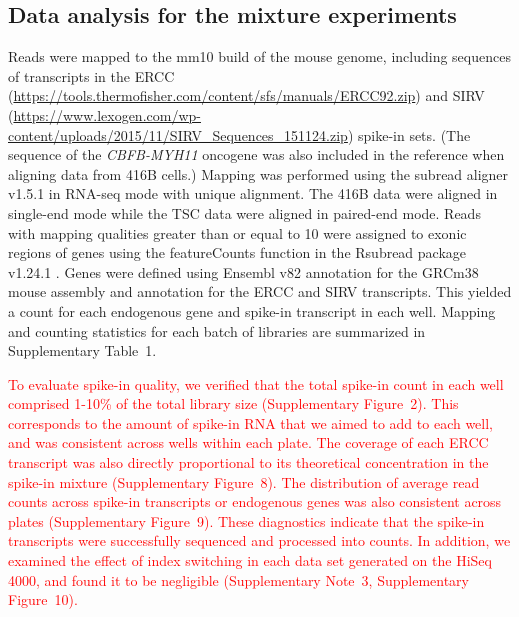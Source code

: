 \documentclass{article}
\newcommand{\suppfigtotals}{2}
\newcommand{\suppfigspikeconc}{8}
\newcommand{\suppfigspikeave}{9}
\newcommand{\suppfigindex}{10}
\newcommand{\suppsecindex}{3}
\newcommand{\supptabstats}{1}
\newcommand{\revised}[1]{\textcolor{red}{#1}}
\begin{document}
\subsection*{Data analysis for the mixture experiments}
Reads were mapped to the mm10 build of the mouse genome, including sequences of transcripts in the ERCC (\url{https://tools.thermofisher.com/content/sfs/manuals/ERCC92.zip}) and SIRV (\url{https://www.lexogen.com/wp-content/uploads/2015/11/SIRV_Sequences_151124.zip}) spike-in sets.
(The sequence of the \textit{CBFB-MYH11} oncogene was also included in the reference when aligning data from 416B cells.)
Mapping was performed using the subread aligner v1.5.1 \citep{liao2013subread} in RNA-seq mode with unique alignment.
The 416B data were aligned in single-end mode while the TSC data were aligned in paired-end mode.
Reads with mapping qualities greater than or equal to 10 were assigned to exonic regions of genes using the featureCounts function in the Rsubread package v1.24.1 \citep{liao2014featurecounts}.
Genes were defined using Ensembl v82 annotation for the GRCm38 mouse assembly and annotation for the ERCC and SIRV transcripts.
This yielded a count for each endogenous gene and spike-in transcript in each well.
Mapping and counting statistics for each batch of libraries are summarized in Supplementary Table~\supptabstats{}.

\revised{To evaluate spike-in quality, we verified that the total spike-in count in each well comprised 1-10\% of the total library size (Supplementary Figure~\suppfigtotals{}).
This corresponds to the amount of spike-in RNA that we aimed to add to each well, and was consistent across wells within each plate.
The coverage of each ERCC transcript was also directly proportional to its theoretical concentration in the spike-in mixture (Supplementary Figure~\suppfigspikeconc{}).
The distribution of average read counts across spike-in transcripts or endogenous genes was also consistent across plates (Supplementary Figure~\suppfigspikeave{}).
These diagnostics indicate that the spike-in transcripts were successfully sequenced and processed into counts.
In addition, we examined the effect of index switching \citep{sinha2017index} in each data set generated on the HiSeq 4000, and found it to be negligible (Supplementary Note~\suppsecindex{}, Supplementary Figure~\suppfigindex{}).}
\end{document}
